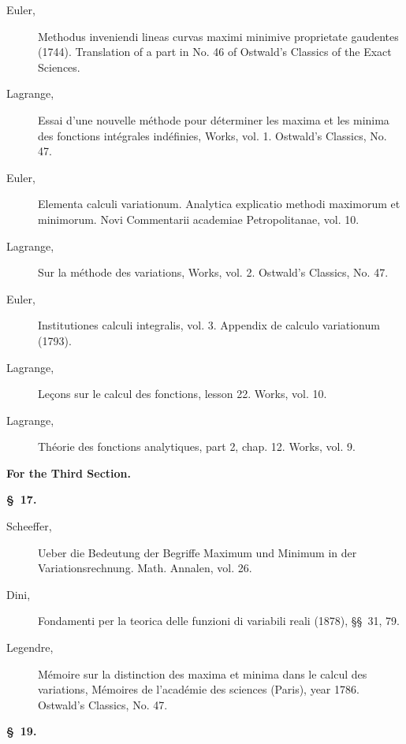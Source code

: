 \documentclass[11pt,a4paper,leqno]{article}
\begin{document}
\begin{description}
\item[Euler,] Methodus inveniendi lineas curvas maximi minimive proprietate
gaudentes (1744). Translation of a part in No. 46 of Ostwald's Classics of
the Exact Sciences.

\item[Lagrange,] Essai d'une nouvelle méthode pour déterminer les maxima et les
minima des fonctions intégrales indéfinies, Works, vol. 1. Ostwald's
Classics, No. 47.

\item[Euler,] Elementa calculi variationum. Analytica explicatio methodi
maximorum et minimorum. Novi Commentarii academiae Petropolitanae, vol. 10.

\item[Lagrange,] Sur la méthode des variations, Works, vol. 2. Ostwald's
Classics, No. 47.

\item[Euler,] Institutiones calculi integralis, vol. 3. Appendix de calculo
variationum (1793).

\item[Lagrange,] Leçons sur le calcul des fonctions, lesson 22. Works, vol. 10.

\item[Lagrange,] Théorie des fonctions analytiques, part 2, chap. 12. Works,
vol. 9.
\end{description}

\begin{center}
{\large\bfseries For the Third Section.}

{\bfseries \S~17.}
\end{center}

\begin{description}
\item[Scheeffer,] Ueber die Bedeutung der Begriffe Maximum und Minimum in der
Variationsrechnung. Math. Annalen, vol. 26.

\item[Dini,] Fondamenti per la teorica delle funzioni di variabili reali
(1878), \S\S~31, 79.

\item[Legendre,] Mémoire sur la distinction des maxima et minima dans le calcul
des variations, Mémoires de l'académie des sciences (Paris), year 1786.
Ostwald's Classics, No. 47.
\end{description}

\begin{center}{\bfseries \S~19.}\end{center}
\end{document}
